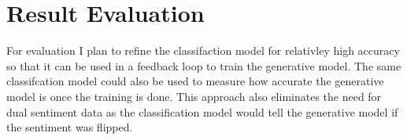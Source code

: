 \documentclass[10pt,titlepage]{article}
\begin{document}
	\section*{Result Evaluation}
	\begin{spverbatim}
		For evaluation I plan to refine the classifaction model for relativley high accuracy so that it can be used in a feedback loop to train the generative model. The same classifcation model could also be used to measure how accurate the generative model is once the training is done. This approach also eliminates the need for dual sentiment data as the classification model would tell the generative model if the sentiment was flipped.
	\end{spverbatim}
	
\end{document}
